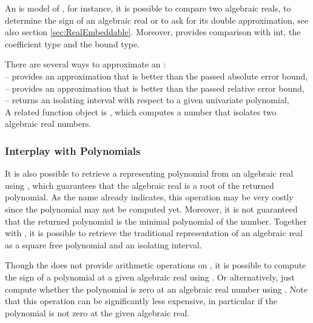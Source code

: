 An  is model of
, for instance, it is possible to compare two
algebraic reals, to determine the sign of an algebraic real or to ask
for its double approximation, see also section \ref{sec:RealEmbeddable}.
Moreover,  provides
comparison with int, the coefficient type and the bound type.

There are several ways to approximate an :\\
 -- provides an approximation that is 
better than the passed absolute error bound,\\
 -- provides an approximation that is 
better than the passed relative error bound,\\
 -- returns an isolating interval with respect to 
a given univariate polynomial,\\
A related function object is , which computes 
a number that isolates two algebraic real numbers. 



\subsubsection{Interplay with Polynomials}
It is also possible to retrieve a representing polynomial from an
algebraic real using , 
which guarantees that the algebraic real is a root of the returned
polynomial. As the name already indicates, this operation may be very
costly since the polynomial may not be computed yet. Moreover, it is
not guaranteed that the returned polynomial is the minimal polynomial
of the number.  Together with , it
is possible to retrieve the traditional representation of an algebraic
real as a square free polynomial and an isolating interval.

Though the  does not provide arithmetic
operations on , it is
possible to compute the sign of a polynomial at a given algebraic
real using .  Or alternatively,
just compute whether the polynomial is zero at an algebraic real number
using .  Note that this operation
can be significantly less expensive, in particular if the polynomial
is not zero at the given algebraic real.

